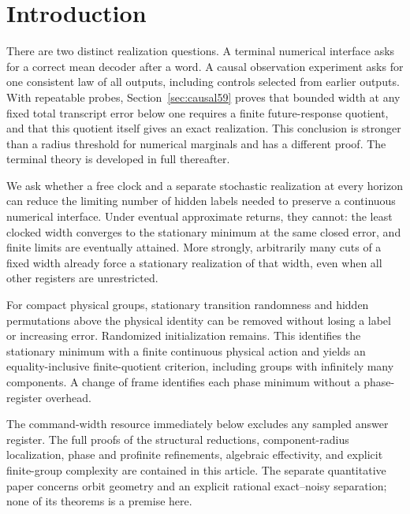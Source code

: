 \section{Introduction}
There are two distinct realization questions. A terminal numerical
interface asks for a correct mean decoder after a word. A causal
observation experiment asks for one consistent law of all outputs,
including controls selected from earlier outputs. With repeatable
probes, Section~\ref{sec:causal59} proves that bounded width at any
fixed total transcript error below one requires a finite future-response
quotient, and that this quotient itself gives an exact realization.
This conclusion is stronger than a radius threshold for numerical
marginals and has a different proof. The terminal theory is developed
in full thereafter.

We ask whether a free clock and a separate stochastic realization at
every horizon can reduce the limiting number of hidden labels needed to
preserve a continuous numerical interface. Under eventual approximate
returns, they cannot: the least clocked width converges to the stationary
minimum at the same closed error, and finite limits are eventually
attained. More strongly, arbitrarily many cuts of a fixed width already
force a stationary realization of that width, even when all other
registers are unrestricted.

For compact physical groups, stationary transition randomness and hidden
permutations above the physical identity can be removed without losing
a label or increasing error. Randomized initialization remains. This
identifies the stationary minimum with a finite continuous physical
action and yields an equality-inclusive finite-quotient criterion,
including groups with infinitely many components. A change of frame
identifies each phase minimum without a phase-register overhead.

The command-width resource immediately below excludes any sampled answer
register. The full proofs of the structural reductions, component-radius
localization, phase and profinite refinements, algebraic effectivity, and
explicit finite-group complexity are contained in this article. The
separate quantitative paper concerns orbit geometry and an explicit
rational exact--noisy separation; none of its theorems is a premise here.
